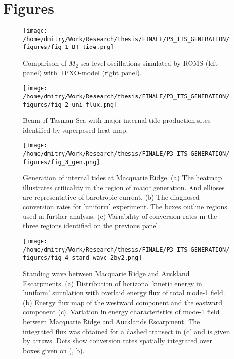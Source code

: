 \documentclass[12pt]{article}
\begin{document}
\newpage
\section{Figures}

\begin{figure}
	\centering
	\texttt{[image: /home/dmitry/Work/Research/thesis/FINALE/P3\_ITS\_GENERATION/figures/fig\_1\_BT\_tide.png]}
	\caption{Comparison of $M_2$ sea level oscillations simulated by ROMS (left panel) with 
	TPXO-model (right panel).}
	\label{C3.fig:BT}
\end{figure}

\begin{figure}
	\centering
	\texttt{[image: /home/dmitry/Work/Research/thesis/FINALE/P3\_ITS\_GENERATION/figures/fig\_2\_uni\_flux.png]}
	\caption{Beam of Tasman Sea with major internal tide production sites identified by superposed 
	heat map.}
	\label{C3.fig:beam}
\end{figure}

\begin{figure}
	\centering
	\texttt{[image: /home/dmitry/Work/Research/thesis/FINALE/P3\_ITS\_GENERATION/figures/fig\_3\_gen.png]}
	\caption{Generation of internal tides at Macquarie Ridge. (a) The heatmap illustrates 
	criticality in the region of major generation. And ellipses are representative of barotropic 
	current. (b) The diagnosed conversion rates for 'uniform' experiment. The boxes outline regions 
	used in further analysis. (c) Variability of conversion rates in the three regions identified 
	on the previous panel.}
	\label{C3.fig:gen}
\end{figure}

\begin{figure}
	\centering
	\texttt{[image: /home/dmitry/Work/Research/thesis/FINALE/P3\_ITS\_GENERATION/figures/fig\_4\_stand\_wave\_2by2.png]}
	\caption{Standing wave between Macquarie Ridge and Auckland Escarpments. (a) Distribution of 
	horizonal kinetic energy in 'uniform' simulation with overlaid energy flux of total mode-1 
	field. (b) Energy flux map of the westward component and the eastward component (c). Variation 
	in energy characteristics of mode-1 field between Macquarie Ridge and Aucklands Escarpment. The 
	integrated flux was obtained for a 	dashed transect in (c) and is given by arrows. Dots show 
	conversion rates spatially integrated over boxes given on (, b).}
	\label{C3.fig:stand_wave}
\end{figure}
\end{document}
